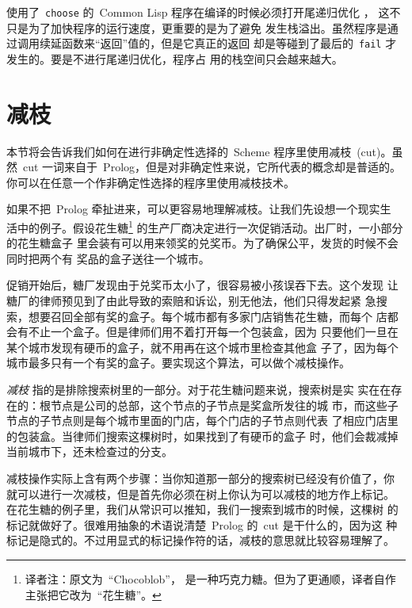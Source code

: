 使用了~\texttt{choose} 的~Common Lisp 程序在编译的时候必须打开尾递归优化
  ，
这不只是为了加快程序的运行速度，更重要的是为了避免
发生栈溢出。虽然程序是通过调用续延函数来``返回''值的，但是它真正的返回
却是等碰到了最后的~\texttt{fail} 才发生的。要是不进行尾递归优化，程序占
用的栈空间只会越来越大。

\section{减枝}
\label{sec:cuts}

本节将会告诉我们如何在进行非确定性选择的~Scheme 程序里使用减枝~(cut)。虽
然~cut 一词来自于~Prolog，但是对非确定性来说，它所代表的概念却是普适的。
你可以在任意一个作非确定性选择的程序里使用减枝技术。

如果不把~Prolog 牵扯进来，可以更容易地理解减枝。让我们先设想一个现实生
活中的例子。假设花生糖\footnote{译者注：原文为~``Chocoblob''，
是一种巧克力糖。但为了更通顺，译者自作主张把它改为~``花生糖''。}
的生产厂商决定进行一次促销活动。出厂时，一小部分的花生糖盒子
里会装有可以用来领奖的兑奖币。为了确保公平，发货的时候不会同时把两个有
奖品的盒子送往一个城市。

促销开始后，糖厂发现由于兑奖币太小了，很容易被小孩误吞下去。这个发现
让糖厂的律师预见到了由此导致的索赔和诉讼，别无他法，他们只得发起紧
急搜索，想要召回全部有奖的盒子。每个城市都有多家门店销售花生糖，而每个
店都会有不止一个盒子。但是律师们用不着打开每一个包装盒，因为
只要他们一旦在某个城市发现有硬币的盒子，就不用再在这个城市里检查其他盒
子了，因为每个城市最多只有一个有奖的盒子。要实现这个算法，可以做个减枝操作。

\emph{减枝} 指的是排除搜索树里的一部分。对于花生糖问题来说，搜索树是实
实在在存在的：根节点是公司的总部，这个节点的子节点是奖盒所发往的城
市，而这些子节点的子节点则是每个城市里面的门店，每个门店的子节点则代表
了相应门店里的包装盒。当律师们搜索这棵树时，如果找到了有硬币的盒子
时，他们会裁减掉当前城市下，还未检查过的分支。

减枝操作实际上含有两个步骤：当你知道那一部分的搜索树已经没有价值了，你
就可以进行一次减枝，但是首先你必须在树上你认为可以减枝的地方作上标记。
在花生糖的例子里，我们从常识可以推知，我们一搜索到城市的时候，这棵树
的标记就做好了。很难用抽象的术语说清楚~Prolog 的~cut 是干什么的，因为这
种标记是隐式的。不过用显式的标记操作符的话，减枝的意思就比较容易理解了。

